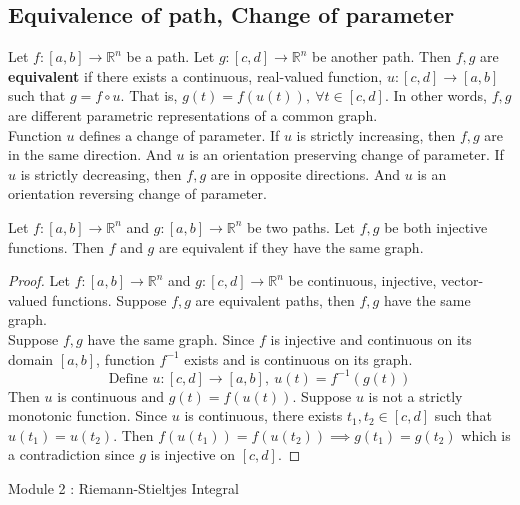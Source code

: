\subsection{Equivalence of path, Change of parameter}
\begin{definition}
	Let $f:[a,b] \to \mathbb{R}^n$ be a path.
	Let $g : [c,d] \to \mathbb{R}^n$ be another path.
	Then $f,g$ are \textbf{equivalent} if there exists a continuous, real-valued function, $u : [c,d] \to [a,b]$ such that $g = f \circ u$.
	That is, $g(t) = f(u(t)),\ \forall t \in [c,d]$.
	In other words, $f,g$ are different parametric representations of a common graph.\\

	Function $u$ defines a change of parameter.
	If $u$ is strictly increasing, then $f,g$ are in the same direction.
	And $u$ is an orientation preserving change of parameter.
	If $u$ is strictly decreasing, then $f,g$ are in opposite directions.
	And $u$ is an orientation reversing change of parameter.
\end{definition}

\begin{theorem}
	Let $f:[a,b] \to \mathbb{R}^n$ and $g : [a,b] \to \mathbb{R}^n$ be two paths.
	Let $f,g$ be both injective functions.
	Then $f$ and $g$ are equivalent if they have the same graph.
\end{theorem}
\begin{proof}
	Let $f : [a,b] \to \mathbb{R}^n$ and $g : [c,d] \to \mathbb{R}^n$ be continuous, injective, vector-valued functions.
	Suppose $f,g$ are equivalent paths, then $f,g$ have the same graph.\\

	Suppose $f,g$ have the same graph.
	Since $f$ is injective and continuous on its domain $[a,b]$, function $f^{-1}$ exists and is continuous on its graph.
	\[ \text{Define } u:[c,d] \to [a,b],\ u(t) = f^{-1}(g(t)) \]
	Then $u$ is continuous and $g(t) = f(u(t))$.
	Suppose $u$ is not a strictly monotonic function. 
	Since $u$ is continuous, there exists $t_1,t_2 \in [c,d]$ such that $u(t_1) = u(t_2)$.
	Then $f(u(t_1)) = f(u(t_2)) \implies g(t_1) = g(t_2)$ which is a contradiction since $g$ is injective on $[c,d]$.
\end{proof}

\pagebreak
{\Large Module 2 : Riemann-Stieltjes Integral}\\
